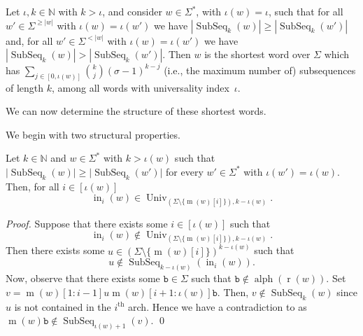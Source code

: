 \documentclass[runningheads,UKenglish,cleveref, autoref, thm-restate]{llncs}
\newcommand{\N}{\mathbb{N}}
\def\ta{\mathtt{a}}
\def\tb{\mathtt{b}}
\def\r{\operatorname{r}}
\def\m{\operatorname{m}}
\DeclareMathOperator{\arch}{ar}
\DeclareMathOperator{\alphabet}{alph}
\DeclareMathOperator\ScatFact{SubSeq}
\DeclareMathOperator{\Univ}{Univ}
\DeclareMathOperator{\inner}{in}
\def\nth#1{#1$^{\text{th}}$}
\newif\ifpaper
\begin{document}
Let $\iota, k\in\N$ with $k > \iota$, 
and consider $w\in\Sigma^*$, with $\iota(w) = \iota$, such that for all $w'\in\Sigma^{\geq |w|}$ with $\iota(w) = \iota(w')$ we have 
$|\ScatFact_k(w)| \geq |\ScatFact_k(w')|$ 
and, for all $w'\in\Sigma^{< |w|}$ with $\iota(w) = \iota(w')$ we have 
$|\ScatFact_k(w)| > |\ScatFact_k(w')|$. Then $w$ is the shortest word over $\Sigma$ which has $ \sum_{j \in [0, \iota(w)]} \binom{k}{j} (\sigma-1)^{k - j}$ (i.e., the maximum number of) subsequences of length $k$, among all words with universality index~$\iota$.

We can now determine the structure of these shortest words.
\ifpaper
We first show that in such a word $w$, the $i^{th}$ arch fulfils $\inner_i(w) \in \Univ_{(\Sigma \setminus \{ \m(w)[i] \}), k - \iota}$, for all $i\in [\iota]$, and also $\r(w) \in \Univ_{(\Sigma \setminus \{ \ta \}), k - \iota}$, for some $\ta\in \Sigma$. From this, and the example-word $w_{\max}$ above, we can first derive their length.
\else 
We begin with two structural properties. 
\fi


\ifpaper
\else
\begin{lemma}\label{lemma:min-abssent-arches-k-iota-universal}
Let $k\in\N$ and $w\in\Sigma^{\ast}$ with $k>\iota(w)$ such that $\vert \ScatFact_k(w) \vert \geq \vert \ScatFact_k(w') \vert$ for every $w' \in \Sigma^*$ with $\iota(w') = \iota(w)$. 
Then,  for all $i \in [\iota(w)]$
\[
\inner_i(w) \in \Univ_{(\Sigma \setminus \{ \m(w)[i] \}), k - \iota(w)}.
\]
\end{lemma}

\begin{proof}
	Suppose that there exists some $i \in [\iota(w)]$ such that 
	\[
	\inner_i(w) \notin \Univ_{(\Sigma\setminus\{\m(w)[i]\}),k-\iota(w)}.
	\]
	Then there exists some $u\in(\Sigma\setminus\{\m(w)[i]\})^{k-\iota(w)}$
	such that 
	\[
	u\notin\ScatFact_{k-\iota(w)}(\inner_i(w)).
	\]
	Now, observe that there exists some $\tb\in\Sigma$ such that $\tb\notin\alphabet(\r(w))$.
	Set $v = \m(w)[1:i-1]u \m(w)[i+1:\iota(w)]\tb$. 
	Then, $v\notin\ScatFact_k(w)$ since $u$ is not contained in the \nth{$i$} arch. Hence we have a contradiction to  as $\m(w)\tb\notin\ScatFact_{\iota(w)+1}(v)$. \qed
\end{proof}
\end{document}
